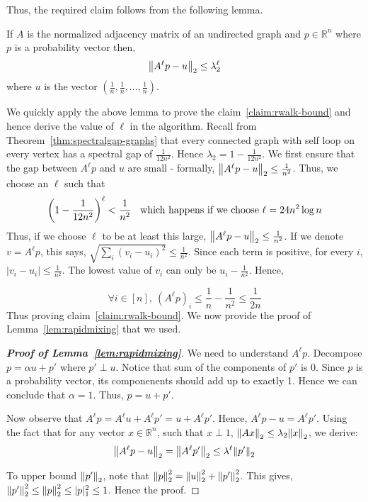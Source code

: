 \vspace{3mm}
\noindent Thus, the required claim follows from the following lemma.
\begin{lemma}
\label{lem:rapidmixing}
If $A$ is the normalized adjacency matrix of an undirected graph and $p \in \mathbb{R}^n$ where $p$ is a probability vector then,
$$ {\left\lVert A^\ell p - u\right\rVert}_2 \le \lambda_2^\ell $$
where $u$ is the vector $\left(\frac{1}{n},\frac{1}{n},\ldots,\frac{1}{n}\right)$.
\end{lemma}

\noindent We quickly apply the above lemma to prove the claim~\ref{claim:rwalk-bound} and hence derive the value of $\ell$ in the algorithm. Recall from Theorem~\ref{thm:spectralgap-graphs} that every connected graph with self loop on every vertex has a spectral gap of $\frac{1}{12n^2}$. Hence $\lambda_2 = 1-\frac{1}{12n^2}$. We first ensure that the gap between $A^\ell p$ and $u$ are small - formally, ${\left\lVert A^\ell p-u\right\rVert}_2 \le \frac{1}{n^2}$. Thus, we choose an $\ell$ such that $$\left(1-\frac{1}{12n^2}\right)^\ell < \frac{1}{n^2} \textrm{\hspace{2mm} which happens if we choose $\ell = 24n^2\log n$}$$
Thus, if we choose $\ell$ to be at least this large, ${\left\lVert A^\ell p - u\right\rVert}_2 \le \frac{1}{n^2}$. If we denote $v = A^\ell p$, this says, $\sqrt{\sum_{i}(v_i-u_i)^2} \le \frac{1}{n^2}$. Since each term is positive, for every $i$, $|v_i - u_i| \le \frac{1}{n^2}$. The lowest value of $v_i$ can only be $u_i - \frac{1}{n^2}$. Hence,

$$\forall i \in [n], ~(A^\ell p)_i \le \frac{1}{n}-\frac{1}{n^2} \le \frac{1}{2n}$$
Thus proving claim~\ref{claim:rwalk-bound}. We now provide the proof of Lemma~\ref{lem:rapidmixing} that we used.

\begin{proof}[\bf Proof of Lemma~\ref{lem:rapidmixing}]
We need to understand $A^\ell p$. Decompose $p = \alpha u + p'$ where $p' \perp u$. Notice that sum of the components of $p'$ is 0. Since $p$ is a probability vector, its componenents should add up to exactly 1. Hence we can conclude that $\alpha=1$. Thus, $p = u+p'$.

Now observe that $A^\ell p = A^\ell u + A^\ell p' = u + A^\ell p'$. Hence, $A^\ell p - u = A^\ell p'$. Using the fact that for any vector $x \in \mathbb{R}^n$, such that $x \perp 1$, ${\left\lVert Ax\right\rVert}_2 \le \lambda_2{\left\lVert x\right\rVert}_2$, we derive:
$${\left\lVert A^\ell p - u\right\rVert}_2 = {\left\lVert A^\ell p'\right\rVert}_2 \le \lambda^\ell{\left\lVert p'\right\rVert}_2 $$

\noindent To upper bound ${\left\lVert p'\right\rVert}_2$, note that ${\left\lVert p\right\rVert}_2^2 = {\left\lVert u\right\rVert}_2^2 + {\left\lVert p'\right\rVert}_2^2$. This gives, ${\left\lVert p'\right\rVert}_2^2 \le {\left\lVert p\right\rVert}_2^2 \le |p|_1^2 \le 1$.
Hence the proof.
\end{proof}

